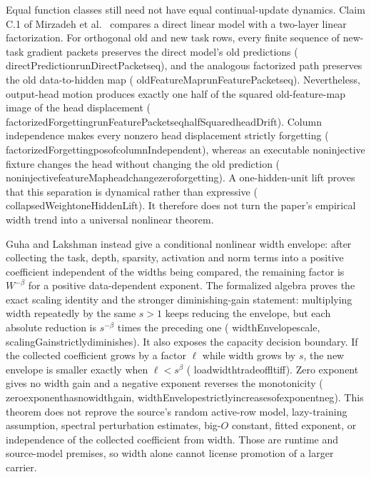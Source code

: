 \documentclass[11pt]{article}
\newcommand{\leanname}[1]{{\scriptsize\ttfamily
  \def\_{\textunderscore\allowbreak}#1}}
\begin{document}
Equal function classes still need not have equal continual-update dynamics.
Claim C.1 of Mirzadeh et al.\ \cite{mirzadeh2022wide} compares a direct linear
model with a two-layer linear factorization.  For orthogonal old and new task
rows, every finite sequence of new-task gradient packets preserves the direct
model's old predictions
(\leanname{directPrediction\_runDirectPackets\_eq}), and the analogous
factorized path preserves the old data-to-hidden map
(\leanname{oldFeatureMap\_runFeaturePackets\_eq}).  Nevertheless, output-head
motion produces exactly one half of the squared old-feature-map image of the
head displacement
(\leanname{factorizedForgetting\_runFeaturePackets\_eq\_halfSquared\_headDrift}).
Column independence makes every nonzero head displacement strictly forgetting
(\leanname{factorizedForgetting\_pos\_of\_columnIndependent}), whereas an
executable noninjective fixture changes the head without changing the old
prediction
(\leanname{noninjective\_featureMap\_head\_change\_zero\_forgetting}).
A one-hidden-unit lift proves that this separation is dynamical rather than
expressive (\leanname{collapsedWeight\_oneHiddenLift}).  It therefore does not
turn the paper's empirical width trend into a universal nonlinear theorem.

Guha and Lakshman \cite{guha2024width} instead give a conditional nonlinear
width envelope: after collecting the task, depth, sparsity, activation and
norm terms into a positive coefficient independent of the widths being
compared, the remaining factor is $W^{-\beta}$ for a positive
data-dependent exponent.  The formalized algebra proves the exact scaling
identity and the stronger diminishing-gain statement: multiplying width
repeatedly by the same $s>1$ keeps reducing the envelope, but each absolute
reduction is $s^{-\beta}$ times the preceding one
(\leanname{widthEnvelope\_scale},
\leanname{scalingGain\_strictly\_diminishes}).  It also exposes the capacity
decision boundary.  If the collected coefficient grows by a factor $\ell$
while width grows by $s$, the new envelope is smaller exactly when
$\ell<s^\beta$
(\leanname{load\_width\_tradeoff\_lt\_iff}).  Zero exponent gives no width
gain and a negative exponent reverses the monotonicity
(\leanname{zero\_exponent\_has\_no\_width\_gain},
\leanname{widthEnvelope\_strictly\_increases\_of\_exponent\_neg}).
This theorem does not reprove the source's random active-row model,
lazy-training assumption, spectral perturbation estimates, big-$O$
constant, fitted exponent, or independence of the collected coefficient
from width.  Those are runtime and source-model premises, so width alone
cannot license promotion of a larger carrier.
\end{document}
